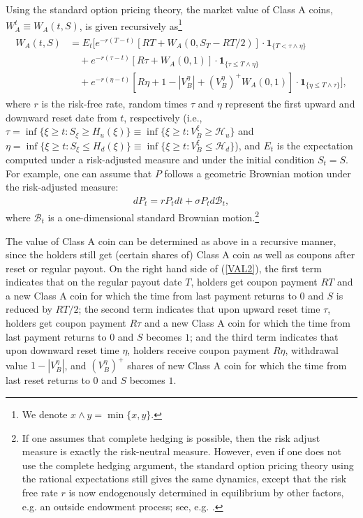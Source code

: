 \documentclass[11pt]{article}%
\numberwithin{equation}{section}
\theoremstyle{plain}
\begin{document}
Using the standard option pricing theory, the market value of Class A coins, $W^t_{A}\equiv W_A(t,S)$, is given recursively as\footnote{We denote $x\land y=\min\{x,y\}$.}
\begin{align}
\begin{split}W_{A}(t,S) & =E_{t}\Bigg[e^{-r(T-t)}[RT+W_A(0,S_T-RT/2)]\cdot\mathbf{1}_{\{T<\tau\land\eta\}}\\
&\quad+e^{-r(\tau-t)}[R\tau+W_{A}(0,1)]\cdot\mathbf{1}_{\{\tau\le T\land\eta\}}\\
 & \quad+e^{-r(\eta-t)}[R\eta+1-|V_{B}^{\eta}|+(V_{B}^{\eta})^+W_{A}(0,1)]\cdot\mathbf{1}_{\{\eta\le T\land\tau\}}\Bigg],
\end{split}
\label{VAL2}
\end{align}
where $r$ is the risk-free rate, random times $\tau$ and $\eta$ represent the first upward and downward reset date from $t$, respectively (i.e., $\tau=\inf \{\xi \ge t:S_{\xi}\ge H_u(\xi)\}\equiv \inf \{\xi \ge t:V^{\xi}_B\ge \mathcal{H}_u\}$ and $\eta=\inf \{\xi\ge t:S_{\xi}\le H_d(\xi)\}\equiv \inf \{\xi \ge t:V^{\xi}_B\leq \mathcal{H}_d\}$), and $E_{t}$ is the expectation computed under a risk-adjusted measure and under the initial condition $S_{t}=S$. For example, one can assume that $P$ follows a geometric Brownian motion under the  risk-adjusted measure:
\begin{align}\label{eqn:GBM}
dP_{t}=r P_tdt+\sigma P_{t}d\mathcal{B}_{t},
\end{align}
where $\mathcal{B}_{t}$ is a one-dimensional standard Brownian motion.\footnote{If one assumes that complete hedging is possible, then the risk adjust measure is exactly the risk-neutral measure. However, even if one does not use the complete hedging argument, the standard option pricing theory using the rational expectations still gives the same dynamics, except that the risk free rate $r$ is now endogenously determined in equilibrium by other factors, e.g. an outside endowment process; see, e.g. \cite{kou2002}.}

The value of Class A coin can be determined as above in a recursive manner, since the holders still get (certain shares of) Class A coin as well as coupons after reset or regular payout. On the right hand side of (\ref{VAL2}), the first term indicates that on the regular payout date $T$, holders get coupon payment $RT$ and a new Class A coin for which the time from last payment returns to 0 and $S$ is reduced by $RT/2$; the second term indicates that upon upward reset time $\tau$, holders get coupon payment $R\tau$ and a new Class A coin for which the time from last payment returns to 0 and $S$ becomes $1$; and the third term indicates that upon downward reset time $\eta$, holders receive coupon payment $R\eta$, withdrawal value $1-|V_{B}^{\eta}|$, and  $(V_{B}^{\eta})^+$ shares of new Class A coin for which the time from last reset returns to 0 and $S$ becomes $1$.
\end{document}
